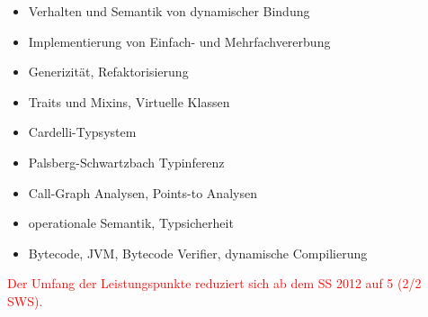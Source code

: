 \begin{course}
\begin{learningoutcomes}
\end{learningoutcomes}

\begin{content}
\begin{itemize}\item Verhalten und Semantik von dynamischer Bindung  \item Implementierung von Einfach- und Mehrfachvererbung  \item Generizität, Refaktorisierung  \item Traits und Mixins, Virtuelle Klassen  \item Cardelli-Typsystem  \item Palsberg-Schwartzbach Typinferenz  \item Call-Graph Analysen, Points-to Analysen  \item operationale Semantik, Typsicherheit  \item Bytecode, JVM, Bytecode Verifier, dynamische Compilierung  \end{itemize}
\end{content}





\begin{remarks}\textcolor{red}{Der Umfang der Leistungspunkte reduziert sich ab dem SS 2012 auf 5 (2/2 SWS).}

\end{remarks}

\end{course}
